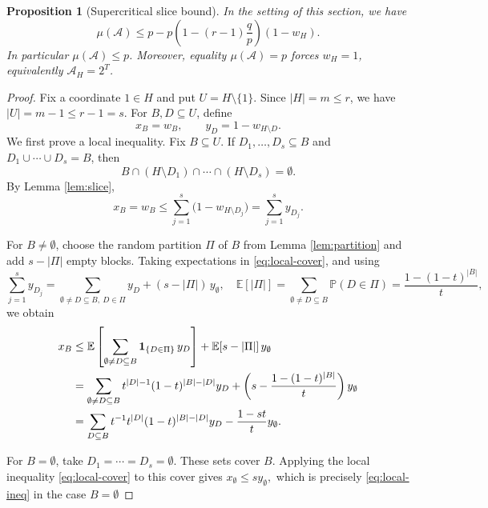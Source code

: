 \documentclass[11pt]{article}
\newtheorem{prop}[theorem]{Proposition}
\begin{document}
\begin{prop}[Supercritical slice bound]\label{prop:slicebound}
In the setting of this section, we have
$$
 \mu(\mathcal{A})\le p-p\left(1-(r-1)\frac{q}{p}\right)(1-w_H).
$$
In particular $\mu(\mathcal{A})\le p$.  Moreover, equality $\mu(\mathcal{A})=p$ forces
$w_H=1$, equivalently $\mathcal{A}_H=2^T$.
\end{prop}

\begin{proof}
Fix a coordinate $1\in H$ and put $U=H\setminus\{1\}$. Since  $|H|=m\le r$, we have $|U|=m-1\le r-1=s$.
For $B,D\subseteq U$, define
$$
 x_B=w_B,
 \qquad y_D=1-w_{H\setminus D}.
$$
We first prove a local inequality.  Fix $B\subseteq U$.  If
$D_1,\ldots,D_s\subseteq B$ and $D_1\cup\cdots\cup D_s=B$, then
$$
 B\cap(H\setminus D_1)\cap\cdots\cap(H\setminus D_s)=\emptyset.
$$
By Lemma \ref{lem:slice},
\begin{equation}\label{eq:local-cover}
 x_B=w_B\le\sum_{j=1}^s\bigl(1-w_{H\setminus D_j}\bigr)
        =\sum_{j=1}^s y_{D_j}.
\end{equation}

For $B\ne\emptyset$, choose the random partition $\Pi$ of $B$ from
Lemma \ref{lem:partition} and add $s-|\Pi|$ empty blocks.  Taking expectations in
\eqref{eq:local-cover}, and using
$$
\sum_{j=1}^s y_{D_j}
=
\sum_{\emptyset\neq D\subseteq B,\ D\in\Pi} y_D
+
(s-|\Pi|)\,y_\emptyset,\quad \mathbb E[|\Pi|]=\sum_{\emptyset\ne D\subseteq B}\mathbb P(D\in\Pi)
          =\frac{1-(1-t)^{|B|}}{t},
$$
we obtain
\begin{align}
 x_B&\le
\mathbb E\left[\sum_{\emptyset\neq D\subseteq B}\mathbf 1_{\{D\in\Pi\}}\,y_D\right]
+
\mathbb E[s-|\Pi|]\,y_\emptyset\notag\\
 &=\sum_{\emptyset\ne D\subseteq B}t^{|D|-1}(1-t)^{|B|-|D|}y_D
     +\left(s-\frac{1-(1-t)^{|B|}}{t}\right)y_\emptyset \notag\\
 &=\sum_{D\subseteq B}t^{-1}t^{|D|}(1-t)^{|B|-|D|}y_D
     -\frac{1-st}{t}y_\emptyset .        \label{eq:local-ineq}
\end{align}

For $B=\emptyset$, take $D_1=\cdots=D_s=\emptyset$. These sets cover $B$. Applying the local inequality \eqref{eq:local-cover} to this cover gives
$
x_\emptyset \le s y_\emptyset,
$
which is precisely \eqref{eq:local-ineq} in the case $B=\emptyset$






\end{proof}
\end{document}

